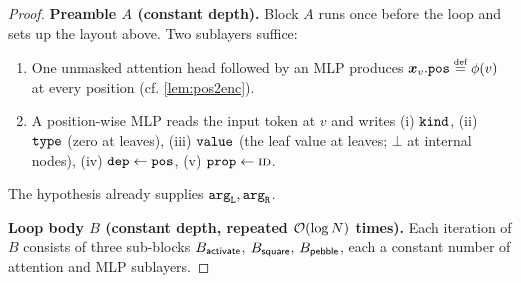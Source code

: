 \documentclass{article}
\begin{document}
\begin{proof}
    \textbf{Preamble $A$ (constant depth).}
    Block $A$ runs once before the loop and sets up the layout above.
    Two sublayers suffice:
    \begin{enumerate}[noitemsep,topsep=0pt,leftmargin=18pt,parsep=0pt]
        \item One unmasked attention head followed by an MLP produces $\vx_v.\fpos \defeq \phi(v)$ at every position (cf. \cref{lem:pos2enc}).
        \item A position-wise MLP reads the input token at $v$ and writes (i) ${\mathtt{kind}}$, (ii) ${\mathtt{type}}$ (zero at leaves), (iii) ${\mathtt{value}}$ (the leaf value at leaves; $\bot$ at internal nodes), (iv) ${\mathtt{dep}} \gets {\mathtt{pos}}$, (v) ${\mathtt{prop}} \gets \textsc{id}$.
    \end{enumerate}
    The hypothesis already supplies ${\mathtt{arg}_\mathtt{L}}, {\mathtt{arg}_\mathtt{R}}$.
    
    \textbf{Loop body $B$ (constant depth, repeated ${{ \mathcal{O}}}(\log {{ N}})$ times).}
    Each iteration of $B$ consists of three sub-blocks $B_{{\textsf{activate}}}$, $B_{{\textsf{square}}}$, $B_{{\textsf{pebble}}}$, each a constant number of attention and MLP sublayers.
    

\end{proof}
\end{document}
